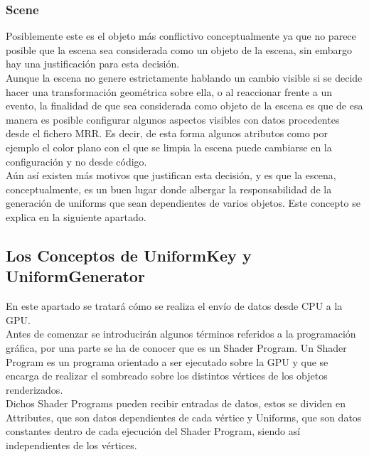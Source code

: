 \subsubsection{Scene}
Posiblemente este es el objeto más conflictivo conceptualmente ya que no parece posible que la escena sea considerada como un objeto de la escena, sin embargo hay una justificación para esta decisión.\\
Aunque la escena no genere estrictamente hablando un cambio visible si se decide hacer una transformación geométrica sobre ella, o al reaccionar frente a un evento, la finalidad de que sea considerada como objeto de la escena es que de esa manera es posible configurar algunos aspectos visibles con datos procedentes desde el fichero MRR. Es decir, de esta forma algunos atributos como por ejemplo el color plano con el que se limpia la escena puede cambiarse en la configuración y no desde código.\\
Aún así existen más motivos que justifican esta decisión, y es que la escena, conceptualmente, es un buen lugar donde albergar la responsabilidad de la generación de uniforms que sean dependientes de varios objetos. Este concepto se explica en la siguiente apartado.

\subsection{Los Conceptos de UniformKey y UniformGenerator}\label{susec:UnifKeyUnifGen}
En este apartado se tratará cómo se realiza el envío de datos desde CPU a la GPU.\\
Antes de comenzar se introducirán algunos términos referidos a la programación gráfica, por una parte se ha de conocer que es un Shader Program. Un Shader Program es un programa orientado a ser ejecutado sobre la GPU y que se encarga de realizar el sombreado sobre los distintos vértices de los objetos renderizados.\\
Dichos Shader Programs pueden recibir entradas de datos, estos se dividen en Attributes, que son datos dependientes de cada vértice y Uniforms, que son datos constantes dentro de cada ejecución del Shader Program, siendo así independientes de los vértices.

